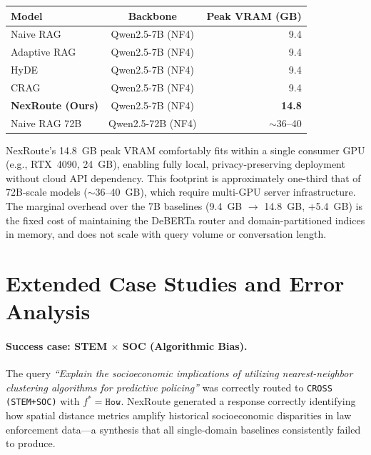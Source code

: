 \documentclass[a4paper,fleql]{cas-sc}
\begin{document}
\vspace{6pt}
\begin{center}
\begingroup
{}
\label{tab:efficiency_app}
\renewcommand{\arraystretch}{1.3}
\begin{tabular}{lcr}
\toprule
\textbf{Model} & \textbf{Backbone} & \textbf{Peak VRAM (GB)} \\
\midrule
Naive RAG        & Qwen2.5-7B (NF4) &  9.4 \\
Adaptive RAG     & Qwen2.5-7B (NF4) &  9.4 \\
HyDE             & Qwen2.5-7B (NF4) &  9.4 \\
CRAG             & Qwen2.5-7B (NF4) &  9.4 \\
\midrule
\textbf{NexRoute (Ours)} & Qwen2.5-7B (NF4) & \textbf{14.8} \\
\midrule
Naive RAG 72B    & Qwen2.5-72B (NF4) & $\sim$36--40 \\
\bottomrule
\end{tabular}
\endgroup
\end{center}
\vspace{6pt}

NexRoute's 14.8~GB peak VRAM comfortably fits within a single consumer
GPU (e.g., RTX~4090, 24~GB), enabling fully local, privacy-preserving
deployment without cloud API dependency. This footprint is approximately
one-third that of 72B-scale models ($\sim$36--40~GB), which require
multi-GPU server infrastructure. The marginal overhead over the 7B
baselines (9.4~GB $\to$ 14.8~GB, $+$5.4~GB) is the fixed cost of
maintaining the DeBERTa router and domain-partitioned indices in memory,
and does not scale with query volume or conversation length.
\section{Extended Case Studies and Error Analysis}
\label{app:casestudies}

\paragraph{Success case: STEM $\times$ SOC (Algorithmic Bias).}
The query \textit{``Explain the socioeconomic implications of utilizing
nearest-neighbor clustering algorithms for predictive policing''} was
correctly routed to \texttt{CROSS (STEM+SOC)} with $f^* = \texttt{How}$.
NexRoute generated a response correctly identifying how spatial distance
metrics amplify historical socioeconomic disparities in law enforcement
data---a synthesis that all single-domain baselines consistently failed
to produce.
\end{document}
